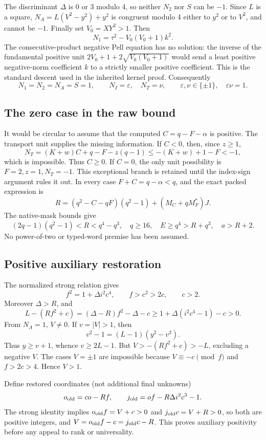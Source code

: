 \documentclass[11pt]{article}
\begin{document}
The discriminant \(\Delta\) is 0 or 3 modulo 4, so neither \(N_2\) nor \(S\) can be \(-1\). Since \(L\) is a square, \(N_A=L(V^2-y^2)+y^2\) is congruent modulo 4 either to \(y^2\) or to \(V^2\), and cannot be \(-1\). Finally set \(V_0=XY^2>1\). Then
\[
 N_1=\tau^2-V_0(V_0+1)k^2.
\]
The consecutive-product negative Pell equation has no solution: the inverse of the fundamental positive unit \(2V_0+1+2\sqrt{V_0(V_0+1)}\) would send a least positive negative-norm coefficient \(k\) to a strictly smaller positive coefficient. This is the standard descent used in the inherited kernel proof. Consequently
\[
 N_1=N_2=N_A=S=1,\qquad N_I=\varepsilon,\quad N_T=\nu,
 \qquad \varepsilon,\nu\in\{\pm1\},\quad\varepsilon\nu=1.
\]

\subsection{The zero case in the raw bound}
It would be circular to assume that the computed \(C=q-F-\alpha\) is positive. The transport unit supplies the missing information. If \(C<0\), then, since \(z\ge1\),
\[
 N_T=(K+w)C+q-F-z(q-1)\le -(K+w)+1-F<-1,
\]
which is impossible. Thus \(C\ge0\). If \(C=0\), the only unit possibility is \(F=2,z=1,N_T=-1\). This exceptional branch is retained until the index-sign argument rules it out. In every case \(F+C=q-\alpha<q\), and the exact packed expression is
\[
 R=(q^2-C-qF)(q^2-1)+(M_C+qM_F^*)J.
\]
The native-mask bounds give
\begin{equation}\label{eq:outer}
 (2q-1)(q^2-1)<R<q^4-q^3,\quad q\ge16,\quad
 E\ge q^4>R+q^3,\quad a>R+2.
\end{equation}
No power-of-two or typed-word premise has been assumed.

\subsection{Positive auxiliary restoration}
The normalized strong relation gives
\[
 f^2=1+\Delta i^2c^4,\qquad f>c^2>2c,\qquad c>2.
\]
Moreover \(\Delta>R\), and
\[
 L-(Rf^2+c)=(\Delta-R)f^2-\Delta-c
 \ge1+\Delta(i^2c^4-1)-c>0.
\]
From \(N_A=1\), \(V\ne0\). If \(v=|V|>1\), then
\[
 v^2-1=(L-1)(y^2-v^2).
\]
Thus \(y\ge v+1\), whence \(v\ge2L-1\). But
\(V>-(Rf^2+c)>-L\), excluding a negative \(V\). The cases \(V=\pm1\) are impossible because \(V\equiv-c\pmod f\) and \(f>2c>4\). Hence \(V>1\).

Define restored coordinates (not additional final unknowns)
\[
 o_{\rm old}=co-Rf,\qquad
 j_{\rm old}=of-R\Delta i^2c^3-1.
\]
The strong identity implies \(o_{\rm old}f=V+c>0\) and
\(j_{\rm old}c=V+R>0\), so both are positive integers, and
\(V=o_{\rm old}f-c=j_{\rm old}c-R\). This proves auxiliary positivity before any appeal to rank or universality.
\end{document}
